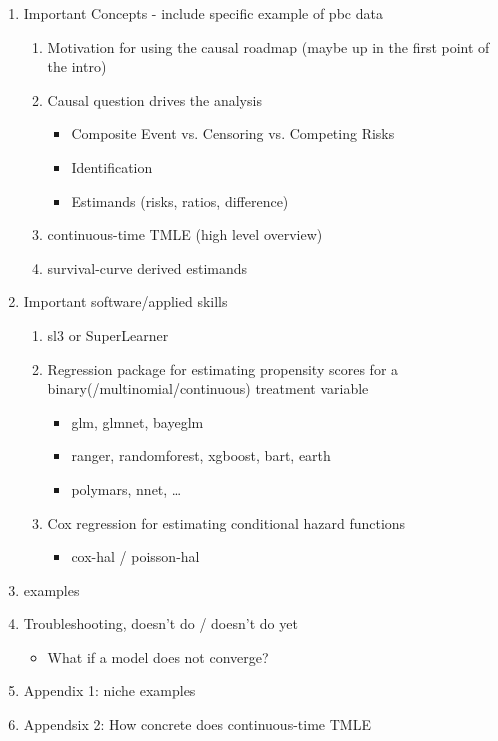 \documentclass{report}
\newcommand{\1}{\ensuremath{\mathbf{1}}}
\begin{document}
\begin{enumerate}
\item Important Concepts - include specific example of pbc data
\begin{enumerate}
\item Motivation for using the causal roadmap (maybe up in the first point of the intro)
\item Causal question drives the analysis
\begin{itemize}
\item Composite Event vs. Censoring vs. Competing Risks
\item Identification
\item Estimands (risks, ratios, difference)
\end{itemize}
\item continuous-time TMLE (high level overview)
\item survival-curve derived estimands
\end{enumerate}

\item Important software/applied skills
\begin{enumerate}
\item sl3 or SuperLearner
\item Regression package for estimating propensity scores for a binary(/multinomial/continuous) treatment variable
\begin{itemize}
\item glm, glmnet, bayeglm
\item ranger, randomforest, xgboost, bart, earth
\item polymars, nnet, \ldots{}
\end{itemize}
\item Cox regression for estimating conditional hazard functions
\begin{itemize}
\item cox-hal / poisson-hal
\end{itemize}
\end{enumerate}

\item examples

\item Troubleshooting, doesn't do / doesn't do yet
\begin{itemize}
\item What if a model does not converge?
\end{itemize}

\item Appendix 1: niche examples
\item Appendsix 2: How concrete does continuous-time TMLE
\end{enumerate}
\end{document}
